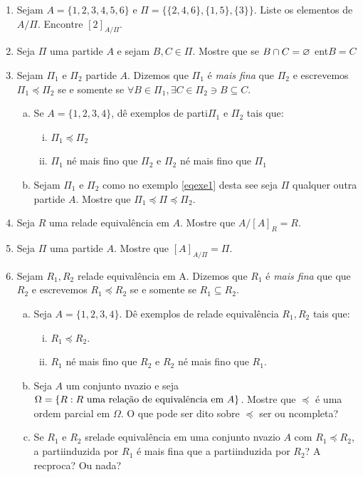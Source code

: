 \begin{enumerate}[{\bf 1.}]

\item Sejam $A=\{1,2,3,4,5,6\}$ e $\Pi=\{\{2,4,6\},\{1,5\},\{3\}\}$. Liste os elementos de $A/\Pi$. Encontre $[2]_{A/\Pi}$. 

\item Seja $\Pi$ uma parti\cao de $A$ e sejam $B,C\in\Pi$. Mostre que se $B\cap C=\varnothing$ ent\ao $B=C$

\item\label{eqrexcerc3} Sejam $\Pi_1$ e $\Pi_2$ parti\coes de $A$. Dizemos que $\Pi_1$ \'e {\it mais fina} que $\Pi_2$ e escrevemos $\Pi_1\preceq\Pi_2$ se e somente se $\forall B\in \Pi_1, \exists C\in \Pi_2 \ni B\subseteq C$.
\begin{enumerate}[a)]
\item Se $A=\{1,2,3,4\}$, d\^e exemplos de parti\coes $\Pi_1$ e $\Pi_2$ tais que:
\begin{enumerate}[i.]
\item $\Pi_1\preceq\Pi_2$
\item $\Pi_1$ n\ao \'e mais fino que $\Pi_2$ e $\Pi_2$ n\ao \'e mais fino que $\Pi_1$
\end{enumerate}
\item Sejam $\Pi_1$ e $\Pi_2$ como no exemplo \ref{eqexe1} desta se\cao e seja $\Pi$ qualquer outra parti\cao de $A$. Mostre que $\Pi_1\preceq\Pi\preceq\Pi_2$.
\end{enumerate}

\item Seja $R$ uma rela\cao de equival\^encia em $A$. Mostre que $A/[A]_R=R$.

\item Seja $\Pi$ uma parti\cao de $A$. Mostre que $[A]_{A/\Pi}=\Pi$.

\item Sejam $R_1,R_2$ rela\coes de equival\^encia em A. Dizemos que $R_1$ \'e {\it mais fina} que que $R_2$ e escrevemos $R_1\preceq R_2$ se e somente se $R_1\subseteq R_2$.
\begin{enumerate}[a)]
\item Seja $A=\{1,2,3,4\}$. D\^e exemplos de rela\coes de equival\^encia $R_1,R_2$ tais que:
\begin{enumerate}[i)]
\item $R_1\preceq R_2$.
\item $R_1$ n\ao \'e mais fino que $R_2$ e $R_2$ n\ao \'e mais fino que $R_1$. 
\end{enumerate}
\item Seja $A$ um conjunto n\ao vazio e seja $\Omega=\{R: R \textrm{ uma rela\cao de equival\^encia em $A$}\}$. Mostre que $\preceq$ \'e uma ordem parcial em $\Omega$. O que pode ser dito sobre $\preceq$ ser ou n\ao completa?
\item Se $R_1$ e $R_2$ s\ao rela\coes de equival\^encia em uma conjunto n\ao vazio $A$ com $R_1\preceq R_2$, a parti\cao induzida por $R_1$ \'e mais fina que a parti\cao induzida por $R_2$? A rec\ih proca? Ou nada?
\end{enumerate}


\end{enumerate}
